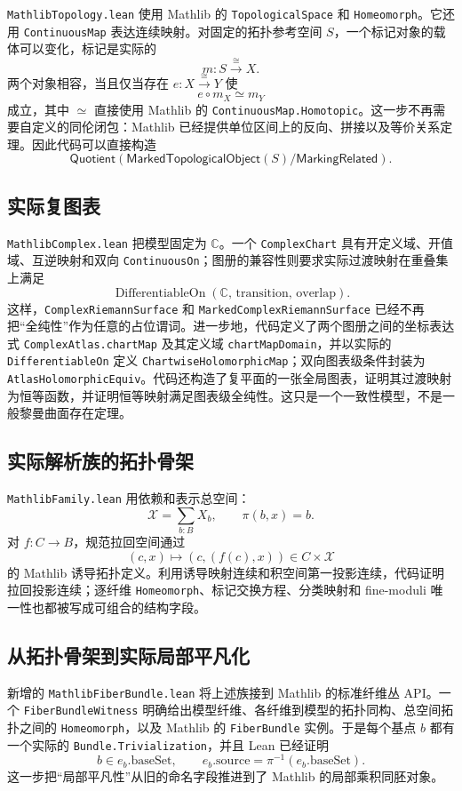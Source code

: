 \documentclass[UTF8,fontset=none,a4paper,11pt]{ctexart}
\begin{document}
\texttt{MathlibTopology.lean} 使用 Mathlib 的 \texttt{TopologicalSpace} 和 \texttt{Homeomorph}。它还用 \texttt{ContinuousMap} 表达连续映射。对固定的拓扑参考空间 \(S\)，一个标记对象的载体可以变化，标记是实际的
\[
  m:S\xrightarrow{\cong}X.
\]
两个对象相容，当且仅当存在 \(e:X\xrightarrow{\cong}Y\) 使
\[
  e\circ m_X\simeq m_Y
\]
成立，其中 \(\simeq\) 直接使用 Mathlib 的 \texttt{ContinuousMap.Homotopic}。这一步不再需要自定义的同伦闭包：Mathlib 已经提供单位区间上的反向、拼接以及等价关系定理。因此代码可以直接构造
\[
  \mathsf{Quotient}(\mathsf{MarkedTopologicalObject}(S)/\mathsf{MarkingRelated}).
\]

\subsection{实际复图表}

\texttt{MathlibComplex.lean} 把模型固定为 \(\mathbb C\)。一个 \texttt{ComplexChart} 具有开定义域、开值域、互逆映射和双向 \texttt{ContinuousOn}；图册的兼容性则要求实际过渡映射在重叠集上满足
\[
  \operatorname{DifferentiableOn}(\mathbb C,\,\text{transition},\,\text{overlap}).
\]
这样，\texttt{ComplexRiemannSurface} 和 \texttt{MarkedComplexRiemannSurface} 已经不再把“全纯性”作为任意的占位谓词。进一步地，代码定义了两个图册之间的坐标表达式 \texttt{ComplexAtlas.chartMap} 及其定义域 \texttt{chartMapDomain}，并以实际的 \texttt{DifferentiableOn} 定义 \texttt{ChartwiseHolomorphicMap}；双向图表级条件封装为 \texttt{AtlasHolomorphicEquiv}。代码还构造了复平面的一张全局图表，证明其过渡映射为恒等函数，并证明恒等映射满足图表级全纯性。这只是一个一致性模型，不是一般黎曼曲面存在定理。

\subsection{实际解析族的拓扑骨架}

\texttt{MathlibFamily.lean} 用依赖和表示总空间：
\[
  \mathcal X=\sum_{b:B}X_b,\qquad \pi(b,x)=b.
\]
对 \(f:C\to B\)，规范拉回空间通过
\[
  (c,x)\longmapsto(c,(f(c),x))\in C\times\mathcal X
\]
的 Mathlib 诱导拓扑定义。利用诱导映射连续和积空间第一投影连续，代码证明拉回投影连续；逐纤维 \texttt{Homeomorph}、标记交换方程、分类映射和 fine-moduli 唯一性也都被写成可组合的结构字段。

\clearpage
\subsection{从拓扑骨架到实际局部平凡化}

新增的 \texttt{MathlibFiberBundle.lean} 将上述族接到 Mathlib 的标准纤维丛 API。一个
\texttt{FiberBundleWitness} 明确给出模型纤维、各纤维到模型的拓扑同构、总空间拓扑之间的
\texttt{Homeomorph}，以及 Mathlib 的 \texttt{FiberBundle} 实例。于是每个基点 $b$ 都有一个实际的
\texttt{Bundle.Trivialization}，并且 Lean 已经证明
\[
  b\in e_b.\mathrm{baseSet},
  \qquad
  e_b.\mathrm{source}=\pi^{-1}(e_b.\mathrm{baseSet}).
\]
这一步把“局部平凡性”从旧的命名字段推进到了 Mathlib 的局部乘积同胚对象。
\end{document}
